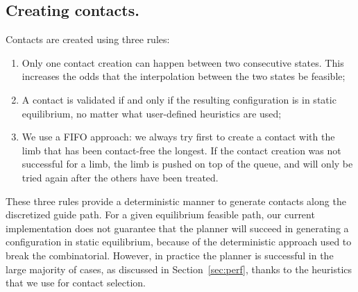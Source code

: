 \subsection{Creating contacts.}
Contacts are created using three rules:
\begin{enumerate}
\item Only one contact creation can happen between two consecutive states. This increases the odds that the interpolation between the two states be feasible;
\item A contact is validated if and only if the resulting configuration is in static equilibrium, no matter what user-defined heuristics are used; 
\item We use a FIFO approach:  we always try first to create a contact with the limb that has been contact-free the longest. If the contact creation
was not successful for a limb, the limb is pushed on top of the queue, and will only be tried again after the others have been treated.
\end{enumerate}

These three rules provide a deterministic manner to generate contacts along the discretized guide path.
For a given \gls{equilibrium feasible} path, our current implementation does not guarantee that the planner will succeed in generating a configuration in static equilibrium, because
of the deterministic approach used to break the combinatorial.
However, in practice the planner is successful in the large majority of cases, as discussed in Section~\ref{sec:perf}, thanks to 
the heuristics that we use for contact selection.
